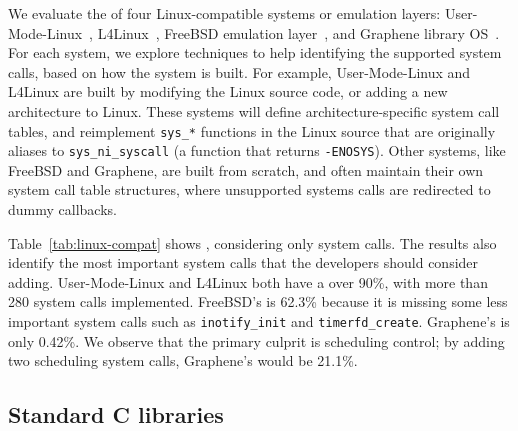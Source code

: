 We evaluate the \compatmetric{} of four Linux-compatible systems or emulation layers:
User-Mode-Linux~\citep{user-mode-linux}, L4Linux~\citep{hartig97mu}, FreeBSD emulation layer~\citep{freebsd-emu}, and Graphene library OS~\citep{tsai14graphene}.
For each system, we explore techniques
to help identifying the supported system calls,
based on how the system is built.
For example, User-Mode-Linux and L4Linux
are built by modifying the Linux source code,
or adding a new architecture to Linux.
These systems will define architecture-specific system call tables,
and reimplement {\tt sys\_*} functions in the Linux source
that are originally aliases to {\tt sys\_ni\_syscall}
(a function that returns {\tt -ENOSYS}). 
Other systems, like FreeBSD and Graphene,
are built from scratch,
and often maintain their own system call table structures,
where unsupported systems calls
are redirected to dummy callbacks.


Table~\ref{tab:linux-compat} shows \compatmetric{},
considering only system calls.
The results also identify the most important system calls
that the developers should consider adding. 
User-Mode-Linux and L4Linux both have a \compatmetric{} over 90\%,
with more than 280 system calls implemented.
FreeBSD's  \compatmetric{} is  62.3\% because it is missing some less
important system calls
such as {\tt inotify\_init} and {\tt timerfd\_create}.
Graphene's \compatmetric{} is only 0.42\%.
We observe that the primary culprit is 
scheduling control; by adding two scheduling system calls,
Graphene's \compatmetric{} would be 21.1\%.

\subsection{Standard C libraries}

